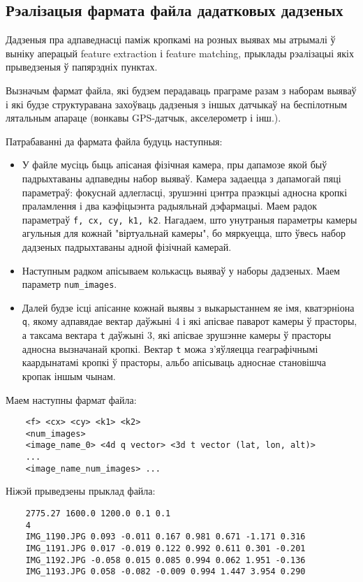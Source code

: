 \subsection*{Рэалізацыя фармата файла дадатковых дадзеных}
Дадзеныя пра адпаведнасці паміж кропкамі на розных выявах мы атрымалі ў выніку аперацый feature extraction і feature matching, прыклады рэалізацыі якіх прыведзеныя ў папярэдніх пунктах.\par
Вызначым фармат файла, які будзем перадаваць праграме разам з наборам выяваў і які будзе структуравана захоўваць дадзеныя з іншых датчыкаў на беспілотным лятальным апараце (вонкавы GPS-датчык, акселерометр і інш.).\par
Патрабаванні да фармата файла будуць наступныя:
\begin{itemize}
    \item У файле мусіць быць апісаная фізічная камера, пры дапамозе якой быў падрыхтаваны адпаведны набор выяваў. Камера задаецца з дапамогай пяці параметраў: фокуснай адлегласці, зрушэнні цэнтра праэкцыі адносна кропкі праламлення і два каэфіцыэнта радыяльнай дэфармацыі. Маем радок параметраў \verb|f, cx, cy, k1, k2|. Нагадаем, што унутраныя параметры камеры агульныя для кожнай "віртуальнай камеры", бо мяркуецца, што ўвесь набор дадзеных падрыхтаваны адной фізічнай камерай.
    \item Наступным радком апісываем колькасць выяваў у наборы дадзеных. Маем параметр \verb|num_images|.
    \item Далей будзе ісці апісанне кожнай выявы з выкарыстаннем яе імя, кватэрніона \verb|q|, якому адпавядае вектар даўжыні 4 і які апісвае паварот камеры ў прасторы, а таксама вектара \verb|t| даўжыні 3, які апісвае зрушэнне камеры ў прасторы адносна вызначанай кропкі. Вектар \verb|t| можа з'яўляецца геаграфічнымі каардынатамі кропкі ў прасторы, альбо апісываць адноснае становішча кропак іншым чынам.
\end{itemize}

Маем наступны фармат файла:
\begin{verbatim}
    <f> <cx> <cy> <k1> <k2>
    <num_images>
    <image_name_0> <4d q vector> <3d t vector (lat, lon, alt)>
    ...
    <image_name_num_images> ...
\end{verbatim}

Ніжэй прыведзены прыклад файла:
\begin{verbatim}
    2775.27 1600.0 1200.0 0.1 0.1
    4
    IMG_1190.JPG 0.093 -0.011 0.167 0.981 0.671 -1.171 0.316
    IMG_1191.JPG 0.017 -0.019 0.122 0.992 0.611 0.301 -0.201
    IMG_1192.JPG -0.058 0.015 0.085 0.994 0.062 1.951 -0.136
    IMG_1193.JPG 0.058 -0.082 -0.009 0.994 1.447 3.954 0.290
\end{verbatim}

